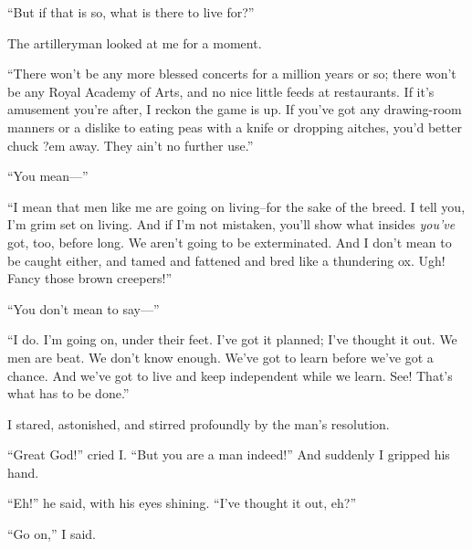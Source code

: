``But if that is so, what is there to live for?''

The artilleryman looked at me for a moment.

``There won't be any more blessed concerts for a million years or
so; there won't be any Royal Academy of Arts, and no nice little
feeds at restaurants. If it's amusement you're after, I reckon the
game is up. If you've got any drawing-room manners or a dislike to
eating peas with a knife or dropping aitches, you'd better chuck
?em away. They ain't no further use.''

``You mean---''

``I mean that men like me are going on living--for the sake of the
breed. I tell you, I'm grim set on living. And if I'm not mistaken,
you'll show what insides \emph{you've} got, too, before long. We
aren't going to be exterminated. And I don't mean to be caught
either, and tamed and fattened and bred like a thundering ox. Ugh!
Fancy those brown creepers!''

``You don't mean to say---''

``I do. I'm going on, under their feet. I've got it planned; I've
thought it out. We men are beat. We don't know enough. We've got to
learn before we've got a chance. And we've got to live and keep
independent while we learn. See! That's what has to be done.''

I stared, astonished, and stirred profoundly by the man's
resolution.

``Great God!'' cried I. ``But you are a man indeed!'' And suddenly I
gripped his hand.

``Eh!'' he said, with his eyes shining. ``I've thought it out, eh?''

``Go on,'' I said.


